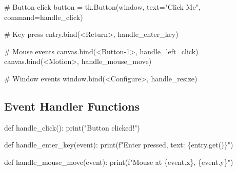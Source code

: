 \documentclass[
  letterpaper,
  DIV=11,
  numbers=noendperiod,
  oneside]{scrreprt}
\newenvironment{Shaded}{}{}
\newcommand{\BuiltInTok}[1]{\textcolor[rgb]{0.84,0.23,0.29}{#1}}
\newcommand{\CommentTok}[1]{\textcolor[rgb]{0.42,0.45,0.49}{#1}}
\newcommand{\KeywordTok}[1]{\textcolor[rgb]{0.84,0.23,0.29}{#1}}
\newcommand{\NormalTok}[1]{\textcolor[rgb]{0.14,0.16,0.18}{#1}}
\newcommand{\OperatorTok}[1]{\textcolor[rgb]{0.14,0.16,0.18}{#1}}
\newcommand{\SpecialCharTok}[1]{\textcolor[rgb]{0.00,0.36,0.77}{#1}}
\newcommand{\SpecialStringTok}[1]{\textcolor[rgb]{0.01,0.18,0.38}{#1}}
\newcommand{\StringTok}[1]{\textcolor[rgb]{0.01,0.18,0.38}{#1}}
\begin{document}
\begin{Shaded}
\begin{Highlighting}[]
\CommentTok{\# Button click}
\NormalTok{button }\OperatorTok{=}\NormalTok{ tk.Button(window, text}\OperatorTok{=}\StringTok{"Click Me"}\NormalTok{, command}\OperatorTok{=}\NormalTok{handle\_click)}

\CommentTok{\# Key press}
\NormalTok{entry.bind(}\StringTok{\textquotesingle{}\textless{}Return\textgreater{}\textquotesingle{}}\NormalTok{, handle\_enter\_key)}

\CommentTok{\# Mouse events}
\NormalTok{canvas.bind(}\StringTok{\textquotesingle{}\textless{}Button{-}1\textgreater{}\textquotesingle{}}\NormalTok{, handle\_left\_click)}
\NormalTok{canvas.bind(}\StringTok{\textquotesingle{}\textless{}Motion\textgreater{}\textquotesingle{}}\NormalTok{, handle\_mouse\_move)}

\CommentTok{\# Window events}
\NormalTok{window.bind(}\StringTok{\textquotesingle{}\textless{}Configure\textgreater{}\textquotesingle{}}\NormalTok{, handle\_resize)}
\end{Highlighting}
\end{Shaded}

\subsection{Event Handler Functions}\label{event-handler-functions}

\begin{Shaded}
\begin{Highlighting}[]
\KeywordTok{def}\NormalTok{ handle\_click():}
    \BuiltInTok{print}\NormalTok{(}\StringTok{"Button clicked!"}\NormalTok{)}

\KeywordTok{def}\NormalTok{ handle\_enter\_key(event):}
    \BuiltInTok{print}\NormalTok{(}\SpecialStringTok{f"Enter pressed, text: }\SpecialCharTok{\{}\NormalTok{entry}\SpecialCharTok{.}\NormalTok{get()}\SpecialCharTok{\}}\SpecialStringTok{"}\NormalTok{)}

\KeywordTok{def}\NormalTok{ handle\_mouse\_move(event):}
    \BuiltInTok{print}\NormalTok{(}\SpecialStringTok{f"Mouse at }\SpecialCharTok{\{}\NormalTok{event}\SpecialCharTok{.}\NormalTok{x}\SpecialCharTok{\}}\SpecialStringTok{, }\SpecialCharTok{\{}\NormalTok{event}\SpecialCharTok{.}\NormalTok{y}\SpecialCharTok{\}}\SpecialStringTok{"}\NormalTok{)}
\end{Highlighting}
\end{Shaded}
\end{document}
